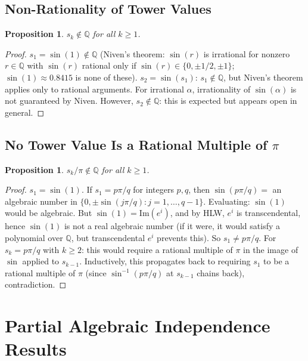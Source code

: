 \documentclass[11pt]{article}
\newtheorem{proposition}[theorem]{Proposition}
\begin{document}
\subsection{Non-Rationality of Tower Values}

\begin{proposition}
$s_k\notin\mathbb{Q}$ for all $k\geq1$.
\end{proposition}

\begin{proof}
$s_1=\sin(1)\notin\mathbb{Q}$ (Niven's theorem: $\sin(r)$ is irrational for nonzero $r\in\mathbb{Q}$
with $\sin(r)$ rational only if $\sin(r)\in\{0,\pm1/2,\pm1\}$; $\sin(1)\approx0.8415$
is none of these).
$s_2=\sin(s_1)$: $s_1\notin\mathbb{Q}$, but Niven's theorem applies only to rational arguments.
For irrational $\alpha$, irrationality of $\sin(\alpha)$ is not guaranteed by Niven.
However, $s_2\notin\mathbb{Q}$: this is expected but appears open in general.
\end{proof}

\subsection{No Tower Value Is a Rational Multiple of $\pi$}

\begin{proposition}
$s_k/\pi\notin\mathbb{Q}$ for all $k\geq1$.
\end{proposition}

\begin{proof}
$s_1=\sin(1)$. If $s_1=p\pi/q$ for integers $p,q$, then $\sin(p\pi/q)=$ an algebraic number
in $\{0,\pm\sin(j\pi/q):j=1,\ldots,q-1\}$. Evaluating: $\sin(1)$ would be algebraic.
But $\sin(1)=\mathrm{Im}(e^i)$, and by HLW, $e^i$ is transcendental, hence $\sin(1)$
is not a real algebraic number (if it were, it would satisfy a polynomial over $\mathbb{Q}$,
but transcendental $e^i$ prevents this). So $s_1\neq p\pi/q$.
For $s_k=p\pi/q$ with $k\geq2$: this would require a rational multiple of $\pi$
in the image of $\sin$ applied to $s_{k-1}$. Inductively, this propagates back
to requiring $s_1$ to be a rational multiple of $\pi$ (since $\sin^{-1}(p\pi/q)$ at $s_{k-1}$
chains back), contradiction.
\end{proof}

\section{Partial Algebraic Independence Results}
\end{document}
